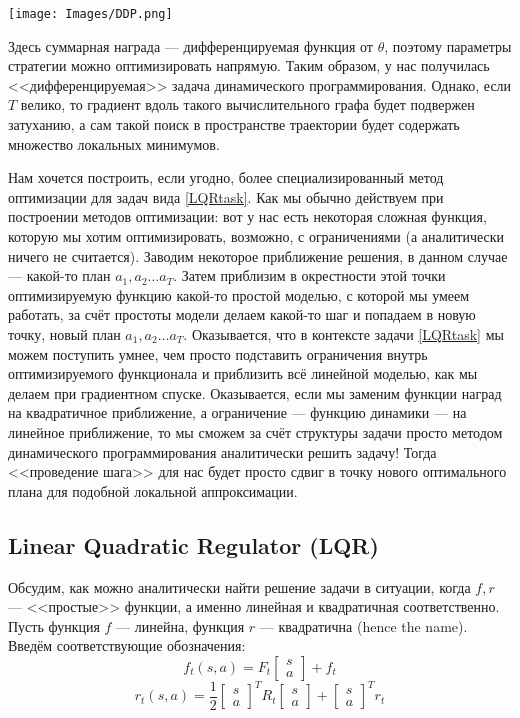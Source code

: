 \begin{center}
    \texttt{[image: Images/DDP.png]}
\end{center}

Здесь суммарная награда --- дифференцируемая функция от $\theta$, поэтому параметры стратегии можно оптимизировать напрямую. Таким образом, у нас получилась <<дифференцируемая>> задача динамического программирования. Однако, если $T$ велико, то градиент вдоль такого вычислительного графа будет подвержен затуханию, а сам такой поиск в пространстве траектории будет содержать множество локальных минимумов.

Нам хочется построить, если угодно, более специализированный метод оптимизации для задач вида \ref{LQRtask}. Как мы обычно действуем при построении методов оптимизации: вот у нас есть некоторая сложная функция, которую мы хотим оптимизировать, возможно, с ограничениями (а аналитически ничего не считается). Заводим некоторое приближение решения, в данном случае --- какой-то план $a_1, a_2 \dots a_T$. Затем приблизим в окрестности этой точки оптимизируемую функцию какой-то простой моделью, с которой мы умеем работать, за счёт простоты модели делаем какой-то шаг и попадаем в новую точку, новый план $a_1, a_2 \dots a_T$. Оказывается, что в контексте задачи \ref{LQRtask} мы можем поступить умнее, чем просто подставить ограничения внутрь оптимизируемого функционала и приблизить всё линейной моделью, как мы делаем при градиентном спуске. Оказывается, если мы заменим функции наград на квадратичное приближение, а ограничение --- функцию динамики --- на линейное приближение, то мы сможем за счёт структуры задачи просто методом динамического программирования аналитически решить задачу! Тогда <<проведение шага>> для нас будет просто сдвиг в точку нового оптимального плана для подобной локальной аппроксимации. 

\subsection{Linear Quadratic Regulator (LQR)}

Обсудим, как можно аналитически найти решение задачи в ситуации, когда $f, r$ --- <<простые>> функции, а именно линейная и квадратичная соответственно. Пусть функция $f$ --- линейна, функция $r$ --- квадратична (hence the name). Введём соответствующие обозначения:
\begin{equation}\label{lineardynamics}
f_t(s, a) = F_t \begin{bmatrix} s \\ a \end{bmatrix} + f_t
\end{equation}
$$r_t(s, a) = \frac{1}{2} \begin{bmatrix} s \\ a \end{bmatrix}^T R_t \begin{bmatrix} s \\ a \end{bmatrix} + \begin{bmatrix} s \\ a \end{bmatrix}^T r_t$$

